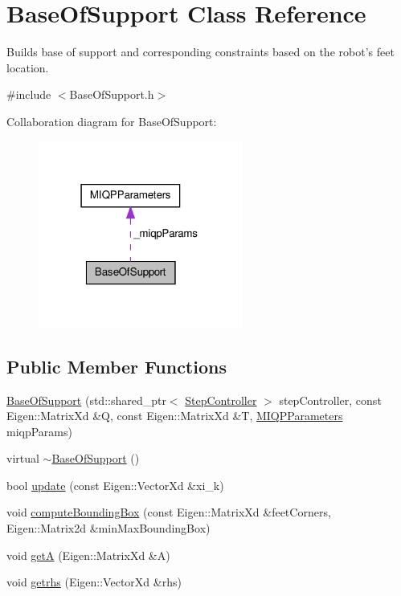 \hypertarget{classBaseOfSupport}{\section{\-Base\-Of\-Support \-Class \-Reference}
\label{classBaseOfSupport}
}


\-Builds base of support and corresponding constraints based on the robot's feet location.  




{\ttfamily \#include $<$\-Base\-Of\-Support.\-h$>$}



\-Collaboration diagram for \-Base\-Of\-Support\-:\nopagebreak
\begin{figure}[H]
\begin{center}
\leavevmode
\includegraphics[width=190pt]{classBaseOfSupport__coll__graph}
\end{center}
\end{figure}
\subsection*{\-Public \-Member \-Functions}
\begin{DoxyCompactItemize}
\item 
\hyperlink{classBaseOfSupport_a08c057e24478097c54ddaf7e4378466e}{\-Base\-Of\-Support} (std\-::shared\-\_\-ptr$<$ \hyperlink{classStepController}{\-Step\-Controller} $>$ step\-Controller, const \-Eigen\-::\-Matrix\-Xd \&\-Q, const \-Eigen\-::\-Matrix\-Xd \&\-T, \hyperlink{structMIQPParameters}{\-M\-I\-Q\-P\-Parameters} miqp\-Params)
\item 
virtual \hyperlink{classBaseOfSupport_a8f2261d4d25cd677d0114df426dfbfa7}{$\sim$\-Base\-Of\-Support} ()
\item 
bool \hyperlink{classBaseOfSupport_a1b9919def962e87ba6de27fb744da284}{update} (const \-Eigen\-::\-Vector\-Xd \&xi\-\_\-k)
\item 
void \hyperlink{classBaseOfSupport_a8ab32cc933754f6307c7d749189adbfe}{compute\-Bounding\-Box} (const \-Eigen\-::\-Matrix\-Xd \&feet\-Corners, \-Eigen\-::\-Matrix2d \&min\-Max\-Bounding\-Box)
\item 
void \hyperlink{classBaseOfSupport_aea8a83e44da4acb1fdbf47cf0e3484d8}{get\-A} (\-Eigen\-::\-Matrix\-Xd \&\-A)
\item 
void \hyperlink{classBaseOfSupport_a66c01d9333eb29e5847c01b5b5a51380}{getrhs} (\-Eigen\-::\-Vector\-Xd \&rhs)
\end{DoxyCompactItemize}
